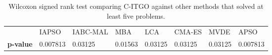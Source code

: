 \begin{table*}[tp]
    \tiny
    \begin{center}
    
    \begin{tabular}{ P{1.0cm} P{1.0cm} P{1.2cm} P{1.0cm} P{1.0cm} P{1.0cm} P{1.0cm} P{1.0cm} }

                     & IAPSO & IABC-MAL & MBA & LCA & CMA-ES & MVDE & APSO \\[1em]
    \rule{0pt}{3ex}
    \textbf{p-value} & 0.007813 & 0.03125 & 0.01563 & 0.03125 & 0.03125 & 0.03125 & 0.007813 \\


    \end{tabular}
    \end{center}
    \vspace*{-4mm}
    \captionsetup{justification=centering}
    \caption{Wilcoxon signed rank test comparing C-ITGO against other methods that solved at least five problems. \\[1em]}
    \label{tab:Wilcoxon}
\end{table*}